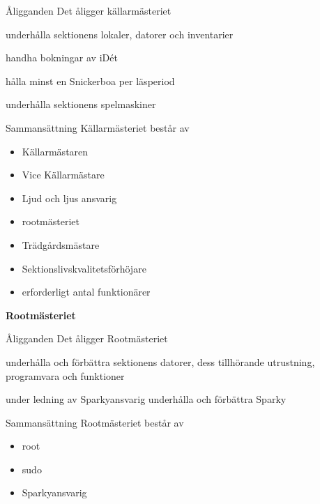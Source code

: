 \documentclass[pdfbookmarks,a4paper,11pt]{article}
\newlength{\itemcollength}
\newenvironment{reglemlista}{%
  \begin{list}{}{%
      \setlength{\labelwidth}{\itemcollength}%
      \setlength{\leftmargin}{\labelwidth + \labelsep}%
      \renewcommand{\makelabel}[1]{%
        \raisebox{0pt}[1ex][0pt]{%
          \makebox[\labelwidth][l]{%
            \parbox[t]{\itemcollength}{%
              \raggedright\hspace{0pt}##1}}}\hfill}%
      }}{%
  \end{list}}
\begin{document}
\begin{reglemlista}

  \item[Åligganden]
    Det åligger källarmästeriet
    \begin{attlista}
      \item underhålla sektionens lokaler, datorer och inventarier
      \item handha bokningar av iDét
      \item hålla minst en Snickerboa per läsperiod
      \item underhålla sektionens spelmaskiner
    \end{attlista}


  \item[Sammansättning]
    Källarmästeriet består av
    \begin{itemize}
      \item Källarmästaren
      \item Vice Källarmästare
      \item Ljud och ljus ansvarig
      \item rootmästeriet
      \item Trädgårdsmästare
      \item Sektionslivskvalitetsförhöjare
      \item erforderligt antal funktionärer
    \end{itemize}

  \item[\textbf{Rootmästeriet}]

  	\item[Åligganden]
  		Det åligger Rootmästeriet
  		\begin{attlista}
  			\item underhålla och förbättra sektionens datorer, dess tillhörande utrustning, programvara och funktioner
  			\item under ledning av Sparkyansvarig underhålla och förbättra Sparky
  		\end{attlista}

	\item[Sammansättning]
		Rootmästeriet består av
		\begin{itemize}
			\item root
			\item sudo
			\item Sparkyansvarig
		\end{itemize}

\end{reglemlista}
\end{document}
